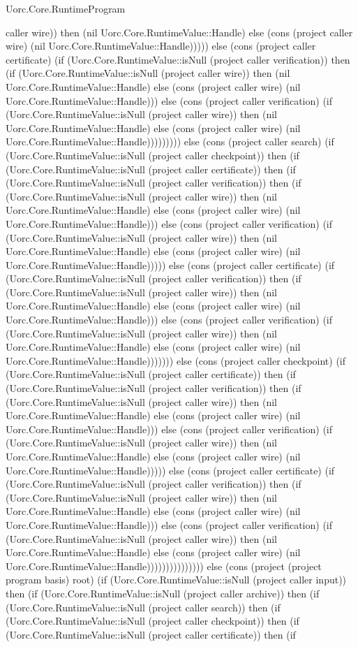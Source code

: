 \begin{lexlean}{Uorc.Core.RuntimeProgram}
\begin{semanticmodule}
{caller wire)) then (nil Uorc.Core.RuntimeValue::Handle) else (cons (project caller wire) (nil Uorc.Core.RuntimeValue::Handle))))) else (cons (project caller certificate) (if (Uorc.Core.RuntimeValue::isNull (project caller verification)) then (if (Uorc.Core.RuntimeValue::isNull (project caller wire)) then (nil Uorc.Core.RuntimeValue::Handle) else (cons (project caller wire) (nil Uorc.Core.RuntimeValue::Handle))) else (cons (project caller verification) (if (Uorc.Core.RuntimeValue::isNull (project caller wire)) then (nil Uorc.Core.RuntimeValue::Handle) else (cons (project caller wire) (nil Uorc.Core.RuntimeValue::Handle))))))))) else (cons (project caller search) (if (Uorc.Core.RuntimeValue::isNull (project caller checkpoint)) then (if (Uorc.Core.RuntimeValue::isNull (project caller certificate)) then (if (Uorc.Core.RuntimeValue::isNull (project caller verification)) then (if (Uorc.Core.RuntimeValue::isNull (project caller wire)) then (nil Uorc.Core.RuntimeValue::Handle) else (cons (project caller wire) (nil Uorc.Core.RuntimeValue::Handle))) else (cons (project caller verification) (if (Uorc.Core.RuntimeValue::isNull (project caller wire)) then (nil Uorc.Core.RuntimeValue::Handle) else (cons (project caller wire) (nil Uorc.Core.RuntimeValue::Handle))))) else (cons (project caller certificate) (if (Uorc.Core.RuntimeValue::isNull (project caller verification)) then (if (Uorc.Core.RuntimeValue::isNull (project caller wire)) then (nil Uorc.Core.RuntimeValue::Handle) else (cons (project caller wire) (nil Uorc.Core.RuntimeValue::Handle))) else (cons (project caller verification) (if (Uorc.Core.RuntimeValue::isNull (project caller wire)) then (nil Uorc.Core.RuntimeValue::Handle) else (cons (project caller wire) (nil Uorc.Core.RuntimeValue::Handle))))))) else (cons (project caller checkpoint) (if (Uorc.Core.RuntimeValue::isNull (project caller certificate)) then (if (Uorc.Core.RuntimeValue::isNull (project caller verification)) then (if (Uorc.Core.RuntimeValue::isNull (project caller wire)) then (nil Uorc.Core.RuntimeValue::Handle) else (cons (project caller wire) (nil Uorc.Core.RuntimeValue::Handle))) else (cons (project caller verification) (if (Uorc.Core.RuntimeValue::isNull (project caller wire)) then (nil Uorc.Core.RuntimeValue::Handle) else (cons (project caller wire) (nil Uorc.Core.RuntimeValue::Handle))))) else (cons (project caller certificate) (if (Uorc.Core.RuntimeValue::isNull (project caller verification)) then (if (Uorc.Core.RuntimeValue::isNull (project caller wire)) then (nil Uorc.Core.RuntimeValue::Handle) else (cons (project caller wire) (nil Uorc.Core.RuntimeValue::Handle))) else (cons (project caller verification) (if (Uorc.Core.RuntimeValue::isNull (project caller wire)) then (nil Uorc.Core.RuntimeValue::Handle) else (cons (project caller wire) (nil Uorc.Core.RuntimeValue::Handle))))))))))))))) else (cons (project (project program basis) root) (if (Uorc.Core.RuntimeValue::isNull (project caller input)) then (if (Uorc.Core.RuntimeValue::isNull (project caller archive)) then (if (Uorc.Core.RuntimeValue::isNull (project caller search)) then (if (Uorc.Core.RuntimeValue::isNull (project caller checkpoint)) then (if (Uorc.Core.RuntimeValue::isNull (project caller certificate)) then (if }
\end{semanticmodule}
\end{lexlean}
